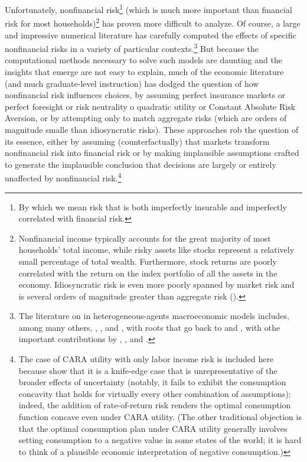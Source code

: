 \documentclass[titlepage,abstract]{\econtex}\newcommand{\texname}{ctDiscrete}
\begin{document}
Unfortunately, nonfinancial risk\footnote{By which we mean risk that
  is both imperfectly insurable and imperfectly correlated with
  financial risk.} (which is much more important than financial risk
for most households)\footnote{Nonfinancial income typically accounts
  for the great majority of most households' total income, while risky
  assets like stocks represent a relatively small percentage of total
  wealth. Furthermore, stock returns are poorly correlated with the
  return on the index portfolio of all the assets in the economy.
  Idiosyncratic risk is even more poorly spanned by market risk and is
  several orders of magnitude greater than aggregate risk
  (\cite{Jagannathan:Kubota:Takehara:1998}).}  has proven more
difficult to analyze.  Of course, a large and impressive numerical
literature has carefully computed the effects of specific nonfinancial
risks in a variety of particular contexts.\footnote{The literature on
  in heterogeneous-agents macroeconomic models includes, among many
  others, \cite{carroll:brookings}, \cite{aiyagari:ge}, and
  \cite{ksHetero}, with roots that go back to
  \cite{schectman&escudero:results} and \cite{bewleyPIH}, with othe
  important contributions by \cite{clarida:ergodic},
  \cite{zeldesStochastic}, and \cite{cw:cUnderUncert}.}  But because the
computational methods necessary to solve such models are daunting and
the insights that emerge are not easy to explain, much of the economic
literature (and much graduate-level instruction) has dodged the
question of how nonfinancial risk influences choices, by assuming
perfect insurance markets or perfect foresight or risk neutrality o
quadratic utility or Constant Absolute Risk Aversion, or by attempting
only to match aggregate risks (which are orders of magnitude smalle
than idiosyncratic risks).  These approaches rob the question of its
essence, either by assuming (counterfactually) that markets transform
nonfinancial risk into financial risk or by making implausible
assumptions crafted to generate the implausible conclusion
that decisions are largely or entirely unaffected by nonfinancial
risk.\footnote{The case of CARA utility with only labor income risk is
  included here because \cite{carroll&kimball:concavity} show that it
  is a knife-edge case that is unrepresentative of the broader effects
  of uncertainty (notably, it fails to exhibit the consumption
  concavity that holds for virtually every other combination of
  assumptions); indeed, the addition of rate-of-return risk renders
  the optimal consumption function concave even under CARA utility.
  (The other traditional objection is that the optimal consumption
  plan under CARA utility generally involves setting consumption to a
  negative value in some states of the world; it is hard to think of a
  plausible economic interpretation of negative consumption.)}
\end{document}
